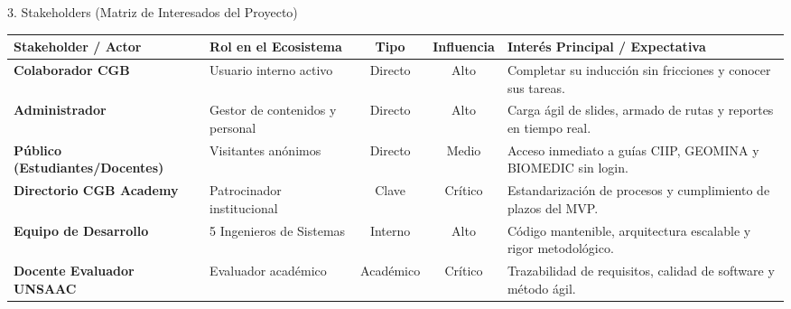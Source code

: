 \documentclass[aspectratio=169, 10pt, spanish]{beamer}
\begin{document}
\begin{frame}{3. Stakeholders (Matriz de Interesados del Proyecto)}
\begin{center}
\scriptsize
\renewcommand{\arraystretch}{1.15}
\begin{tabularx}{\textwidth}{>{\bfseries}p{3.2cm}p{3.2cm}ccX}
\toprule
\textbf{Stakeholder / Actor} & \textbf{Rol en el Ecosistema} & \textbf{Tipo} & \textbf{Influencia} & \textbf{Interés Principal / Expectativa} \\
\midrule
Colaborador CGB & Usuario interno activo & Directo & Alto & Completar su inducción sin fricciones y conocer sus tareas. \\
\rowcolor{unsaacLight}
Administrador & Gestor de contenidos y personal & Directo & Alto & Carga ágil de slides, armado de rutas y reportes en tiempo real. \\
Público (Estudiantes/Docentes) & Visitantes anónimos & Directo & Medio & Acceso inmediato a guías CIIP, GEOMINA y BIOMEDIC sin login. \\
\rowcolor{unsaacLight}
Directorio CGB Academy & Patrocinador institucional & Clave & Crítico & Estandarización de procesos y cumplimiento de plazos del MVP. \\
Equipo de Desarrollo & 5 Ingenieros de Sistemas & Interno & Alto & Código mantenible, arquitectura escalable y rigor metodológico. \\
\rowcolor{unsaacLight}
Docente Evaluador UNSAAC & Evaluador académico & Académico & Crítico & Trazabilidad de requisitos, calidad de software y método ágil. \\
\bottomrule
\end{tabularx}
\end{center}
\end{frame}
\end{document}
